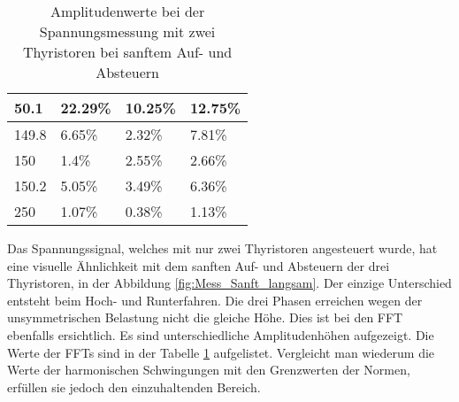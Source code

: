 \begin{table}[ht!]
\begin{tabular}{|l|l|l|l|}
		50.1              & 22.29\%                                                                             & 10.25\%                                                                             & 12.75\%                                                                             \\ \hline
		149.8             & 6.65\%                                                                              & 2.32\%                                                                              & 7.81\%                                                                              \\ \hline
		150               & 1.4\%                                                                               & 2.55\%                                                                              & 2.66\%                                                                              \\ \hline
		150.2             & 5.05\%                                                                              & 3.49\%                                                                              & 6.36\%                                                                              \\ \hline
		250             & 1.07\%                                                                              & 0.38\%                                                                              & 1.13\%                                                                              \\ \hline
		
	\end{tabular}
\caption{Amplitudenwerte bei der Spannungsmessung mit zwei Thyristoren bei sanftem Auf- und Absteuern}\label{tab:Mess_2Thyristoren_Spannung_Widerstand_AufAb_sanft}
\end{table}

Das Spannungssignal, welches mit nur zwei Thyristoren angesteuert wurde, hat eine visuelle Ähnlichkeit mit dem sanften Auf- und Absteuern der drei Thyristoren, in der Abbildung \ref{fig:Mess_Sanft_langsam}. Der einzige Unterschied entsteht beim Hoch- und Runterfahren. Die drei Phasen erreichen wegen der unsymmetrischen Belastung nicht die gleiche Höhe. Dies ist bei den FFT ebenfalls ersichtlich. Es sind unterschiedliche Amplitudenhöhen aufgezeigt. Die Werte der FFTs sind in der Tabelle \ref{tab:Mess_2Thyristoren_Spannung_Widerstand_AufAb_sanft} aufgelistet. Vergleicht man wiederum die Werte der harmonischen Schwingungen mit den Grenzwerten der Normen, erfüllen sie jedoch den einzuhaltenden Bereich.


